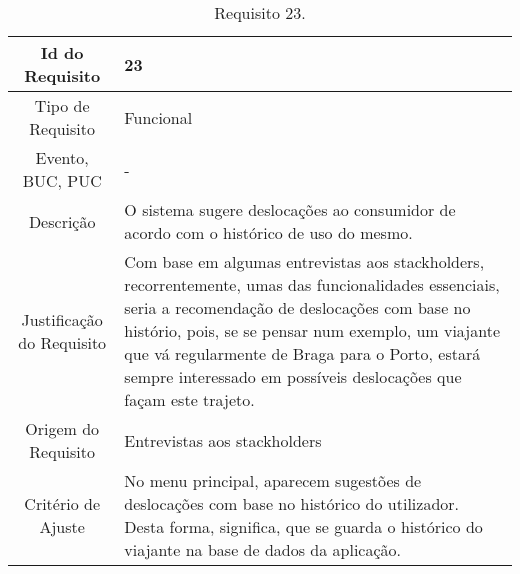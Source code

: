 \begin{table}[H]
\begin{center}
  \begin{tabularx}{\textwidth}{ | c | X | }
    \hline
    Id do Requisito & 23  \\
    
    \hline
    Tipo de Requisito & Funcional \\
    
    \hline
    Evento, BUC, PUC &  - \\
    
    \hline
    Descrição & O sistema sugere deslocações ao consumidor de acordo com o histórico de uso do mesmo. \\
    
    \hline
    Justificação do Requisito & Com base em algumas entrevistas aos stackholders, recorrentemente, umas das funcionalidades essenciais, seria a recomendação de deslocações com base no histório, pois, se se pensar num exemplo, um viajante que vá regularmente de Braga para o Porto, estará sempre interessado em possíveis deslocações que façam este trajeto. \\
    
    \hline
    Origem do Requisito & Entrevistas aos stackholders\\
    
    \hline
    Critério de Ajuste & No menu principal, aparecem sugestões de deslocações com base no histórico do utilizador. Desta forma, significa, que se guarda o histórico do viajante na base de dados da aplicação.   \\
    
    \hline
  \end{tabularx}
  \caption{Requisito 23.} \label{tab:r3}
\end{center}
\end{table}

